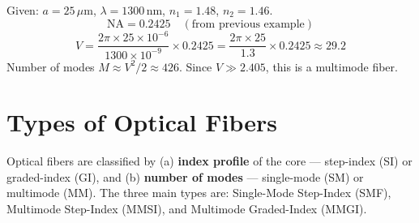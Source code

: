 \documentclass[12pt,a4paper]{article}
\begin{document}
\begin{tcolorbox}[examplebox, title={\textbf{Worked Example: V-Number and Mode Count}}]
Given: $a = 25\,\mu$m, $\lambda = 1300\,$nm, $n_1 = 1.48$, $n_2 = 1.46$.
\[
\text{NA} = 0.2425 \quad (\text{from previous example})
\]
\[
V = \frac{2\pi \times 25\times10^{-6}}{1300\times10^{-9}} \times 0.2425 = \frac{2\pi \times 25}{1.3} \times 0.2425 \approx 29.2
\]
Number of modes $M \approx V^2/2 \approx 426$. Since $V \gg 2.405$, this is a multimode fiber.
\end{tcolorbox}

\section{Types of Optical Fibers}

\begin{tcolorbox}[defbox, title={\textbf{Classification of Optical Fibers}}]
Optical fibers are classified by (a) \textbf{index profile} of the core --- step-index (SI) or graded-index (GI), and (b) \textbf{number of modes} --- single-mode (SM) or multimode (MM). The three main types are: Single-Mode Step-Index (SMF), Multimode Step-Index (MMSI), and Multimode Graded-Index (MMGI).
\end{tcolorbox}
\end{document}
